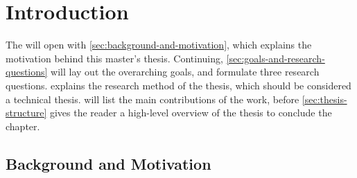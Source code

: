 \chapter{Introduction}
\label{cha:introduction}

\begin{comment}
All chapters should begin with an introduction before any sections, giving an overview of the chapter content.
Each section should in addition start with an introduction before its subsections begin.
Chapters with just one section --- or sections with just one sub-section --- should be avoided.
Think carefully about chapter and section titles as each title stands alone in the table of contents (without associated text)
and should convey the meaning of the contents of the chapter or section.

In all chapters and sections it is important to write clearly and concisely. Avoid repetitions and if needed refer back to the original discussion or presentation.
Each new section, subsection or paragraph should provide the reader with new information and be written in your own words. Avoid direct quotes.
If you use direct quotes, unless the quote itself is very significant, you are conveying to the reader that you are unable to express this discussion or fact yourself.
Such direct quotes also break the flow of the language (yours to someone else's).
\end{comment}

The  will open with \autoref{sec:background-and-motivation}, which explains the motivation behind this master's thesis. Continuing, \autoref{sec:goals-and-research-questions} will lay out the overarching goals, and formulate three research questions.  explains the research method of the thesis, which should be considered a technical thesis.  will list the main contributions of the work, before \autoref{sec:thesis-structure} gives the reader a high-level overview of the thesis to conclude the  chapter.

\section{Background and Motivation}
\label{sec:background-and-motivation}

